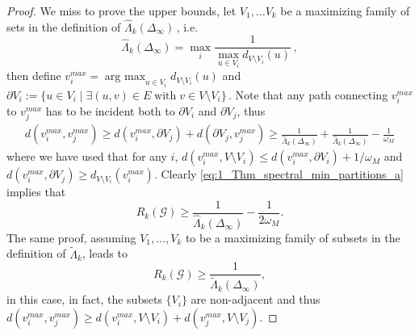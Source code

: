 \documentclass[10pt,a4paper]{amsart}
\newcommand{\Gc}{\mathcal{G}}
\DeclareMathOperator*{\argmax}{arg\:max}
\newcommand{\edgelength}{\omega}
\newcommand{\inflap}{\Delta_{\infty}}
\newcommand{\nodeset}{V}
\begin{document}
\begin{proof}
We miss to prove the upper bounds, let $V_1,\dots V_k$ be a maximizing family of sets in the definition of $\widehat{\Lambda}_k(\inflap)$\,, i.e.
%
\begin{equation}
\widehat{\Lambda}_k(\inflap)=\max_i \frac{1}{\max_{u\in V_i}d_{\nodeset\setminus V_i}(u)}\,,
\end{equation}
%
then define $v_i^{max}=\argmax_{u\in V_i}d_{\nodeset\setminus V_i}(u)$ and $\partial V_i:=\{u\in V_i\;| \;\exists (u,v)\in E\; \text{with}\; v\in \nodeset\setminus V_i\}$\,.
Note that any path connecting $v_i^{max}$ to $v_j^{max}$ has to be incident both to $\partial V_i$ and $\partial V_j$, thus
%
\begin{align}\label{eq:1_Thm_spectral_min_partitions_a}
d(v_i^{max},v_j^{max})\geq d(v_i^{max},\partial V_j) +d(\partial V_j,v_j^{max})\geq \frac{1}{\widehat{\Lambda}_k(\inflap)}+\frac{1}{\widehat{\Lambda}_k(\inflap)}-\frac{1}{\edgelength_M}
\end{align}
%
where we have used that for any $i$,
$d(v_i^{max},\nodeset\setminus V_i)\leq d(v_i^{max},\partial V_i)+1/\edgelength_M$ and $d(v_i^{max},\partial V_j)\geq d_{\nodeset\setminus V_i}(v_i^{max}) $.
Clearly \eqref{eq:1_Thm_spectral_min_partitions_a} implies that 
%
\begin{equation}
 R_k(\Gc)\geq \frac{1}{\widehat{\Lambda}_k(\inflap)}-\frac{1}{2\edgelength_M}.  
\end{equation}
%
The same proof, assuming $V_1,\dots, V_k$ to be a maximizing family of subsets in the definition of $\widetilde{\Lambda}_k$, leads to  
\begin{equation}
    R_k(\Gc)\geq \frac{1}{\widetilde{\Lambda}_k(\inflap)},
\end{equation}
in this case, in fact, the subsets $\{V_i\}$ are non-adjacent and thus $d(v_i^{max},v_j^{max})\geq d(v_i^{max},\nodeset\setminus V_i)+ d(v_j^{max},\nodeset\setminus V_j)$.
\end{proof}
\end{document}
